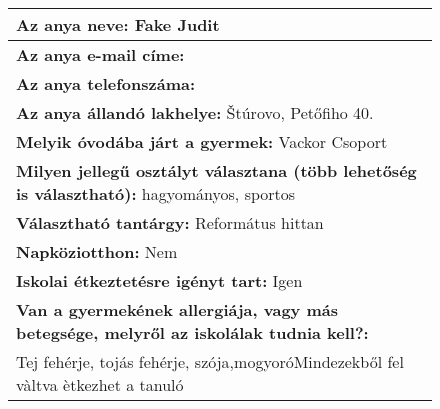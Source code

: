 \documentclass[10pt,a4paper]{article}
\begin{document}
\begin{figure}[!ht]
\begin{tabular}{|m{\textwidth}|}
\hline\vspace{3pt}
\textbf{Az anya neve:} \hspace{0.5cm} Fake Judit \vspace{3pt} \\
\hline\vspace{3pt}
\textbf{Az anya e-mail címe:} \hspace{0.5cm}   \vspace{3pt} \\
\hline\vspace{3pt}
\textbf{Az anya telefonszáma:} \hspace{0.5cm}  \vspace{3pt} \\
\hline\vspace{3pt}
\textbf{Az anya állandó lakhelye:} \hspace{0.5cm} Štúrovo, Petőfiho 40. \vspace{3pt} \\
\hline\vspace{3pt}
\textbf{Melyik óvodába járt a gyermek:} \hspace{0.5cm} Vackor Csoport \vspace{3pt} \\
\hline\vspace{3pt}
\textbf{Milyen jellegű osztályt választana (több lehetőség is választható):} \hspace{0.5cm} hagyományos, sportos \vspace{3pt} \\
\hline\vspace{3pt}
\textbf{Választható tantárgy:} \hspace{0.5cm} Református hittan \vspace{3pt} \\
\hline\vspace{3pt}
\textbf{Napköziotthon:} \hspace{0.5cm} Nem \vspace{3pt} \\
\hline\vspace{3pt}
\textbf{Iskolai étkeztetésre igényt tart:} \hspace{0.5cm} Igen \vspace{3pt} \\
\hline\vspace{3pt}
\textbf{Van a gyermekének allergiája, vagy más betegsége, melyről az iskolálak tudnia kell?:} \\ \hspace{0.5cm} Tej fehérje, tojás fehérje, szója,mogyoróMindezekből fel vàltva ètkezhet a tanuló \vspace{3pt} \\

\end{tabular}
\end{figure}
\end{document}
